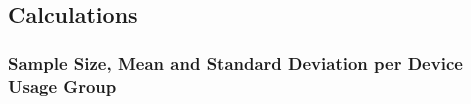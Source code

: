 \documentclass[11pt]{article}
\begin{document}
    \begin{center}
    \end{center}
    { \hspace*{\fill} \\}
    
    \hypertarget{calculations}{%
\subsection{Calculations}\label{calculations}}

    \hypertarget{sample-size-mean-and-standard-deviation-per-device-usage-group}{%
\subsubsection{Sample Size, Mean and Standard Deviation per Device Usage
Group}\label{sample-size-mean-and-standard-deviation-per-device-usage-group}}
\end{document}
